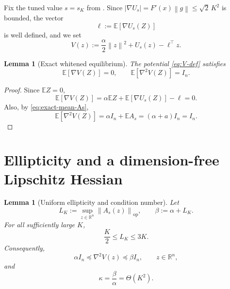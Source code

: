 \documentclass[11pt]{article}
\theoremstyle{plain}
\newtheorem{lemma}[theorem]{Lemma}
\theoremstyle{definition}
\theoremstyle{remark}
\newcommand{\R}{\mathbb{R}}
\newcommand{\E}{\mathbb{E}}
\newcommand{\op}{\mathrm{op}}
\newcommand{\Id}{I}
\newcommand{\1}{\mathbf{1}}
\newcommand{\norm}[1]{\left\lVert #1\right\rVert}
\newcommand{\abs}[1]{\left\lvert #1\right\rvert}
\begin{document}
Fix the tuned value $s=s_K$ from . Since
$\abs{\nabla U_s}=F'(x)\norm g\leq\sqrt2\,K^2$ is bounded, the vector
\begin{equation}
    \ell:=\E[\nabla U_s(Z)]
    \label{eq:ell-def}
\end{equation}
is well defined, and we set
\begin{equation}
    V(z):=\frac{\alpha}{2}\norm z^2+U_s(z)-\ell^\top z.
    \label{eq:V-def}
\end{equation}

\begin{lemma}[Exact whitened equilibrium]
\label{lem:whitening}
The potential \eqref{eq:V-def} satisfies
\[
    \E[\nabla V(Z)]=0,
    \qquad
    \E[\nabla^2V(Z)]=\Id_n.
\]
\end{lemma}

\begin{proof}
Since $\E Z=0$,
\[
    \E[\nabla V(Z)]
    =
    \alpha\E Z+\E[\nabla U_s(Z)]-\ell
    =
    0.
\]
Also, by \eqref{eq:exact-mean-As},
\[
    \E[\nabla^2V(Z)]
    =
    \alpha\Id_n+\E A_s
    =
    (\alpha+a)\Id_n
    =
    \Id_n.
\]
\end{proof}

\section{Ellipticity and a dimension-free Lipschitz Hessian}

\begin{lemma}[Uniform ellipticity and condition number]
\label{lem:ellipticity}
Let
\[
    L_K:=\sup_{z\in\R^n}\norm{A_s(z)}_{\op},
    \qquad
    \beta:=\alpha+L_K.
\]
For all sufficiently large $K$,
\begin{equation}
    \frac K2
    \leq
    L_K
    \leq
    3K.
    \label{eq:LK-bounds}
\end{equation}
Consequently,
\[
    \alpha\Id_n
    \preceq
    \nabla^2V(z)
    \preceq
    \beta\Id_n,
    \qquad z\in\R^n,
\]
and
\begin{equation}
    \kappa=\frac{\beta}{\alpha}=\Theta(K^2).
    \label{eq:kappa-K}
\end{equation}
\end{lemma}
\end{document}
